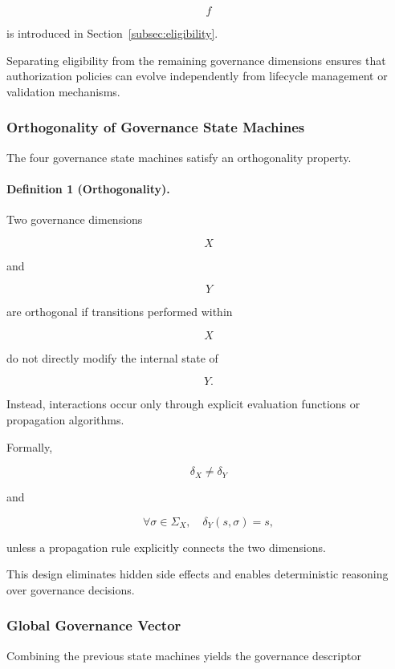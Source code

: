 \documentclass[10pt]{article}
\begin{document}
\[
f
\]

is introduced in
Section~\ref{subsec:eligibility}.

Separating eligibility from the remaining governance dimensions ensures that
authorization policies can evolve independently from lifecycle management or
validation mechanisms.

\subsubsection{Orthogonality of Governance State Machines}

The four governance state machines satisfy an orthogonality property.

\paragraph{Definition 1 (Orthogonality).}

Two governance dimensions

\[
X
\]

and

\[
Y
\]

are orthogonal if transitions performed within

\[
X
\]

do not directly modify the internal state of

\[
Y.
\]

Instead, interactions occur only through explicit evaluation functions or
propagation algorithms.

Formally,

\[
\delta_X
\neq
\delta_Y
\]

and

\[
\forall
\sigma
\in
\Sigma_X,
\quad
\delta_Y(s,\sigma)
=
s,
\]

unless a propagation rule explicitly connects the two dimensions.

This design eliminates hidden side effects and enables deterministic reasoning
over governance decisions.

\subsubsection{Global Governance Vector}

Combining the previous state machines yields the governance descriptor
\end{document}
